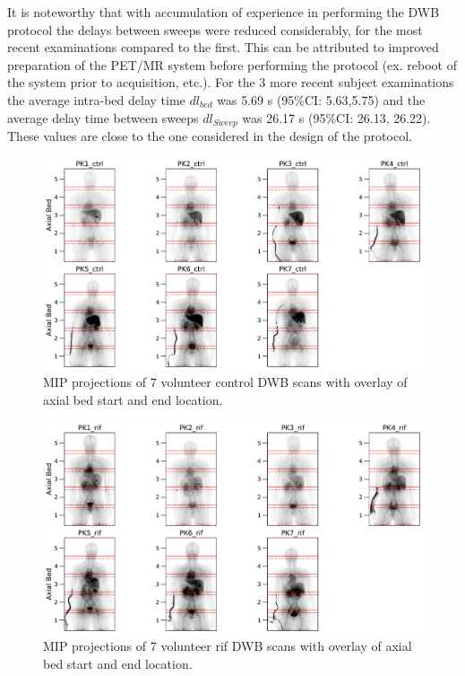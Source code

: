 It is noteworthy that with accumulation of experience in performing the DWB protocol the delays between sweeps were reduced considerably, for the most recent examinations compared to the first. This can be attributed to improved preparation of the PET/MR system before performing the protocol (ex. reboot of the system prior to acquisition, etc.).
For the 3 more recent subject examinations the average intra-bed delay time $dl_{bed}$ was 5.69 s (95\%CI: 5.63,5.75) and the average delay time between sweeps $dl_{Sweep}$ was 26.17 s (95\%CI: 26.13, 26.22).
These values are close to the one considered in the design of the protocol.\\

%
\begin{figure} [ht!]
\centering
\includegraphics[scale=0.5,angle=0]{3_Results/3_1_DWB_Optimization/figures/3_1_MIPS_ctrl.pdf}
\caption{MIP projections of 7 volunteer control DWB scans with overlay of axial bed start and end location.} 
\label{fig3_1:ctrl_mips}
\end{figure}
%
\begin{figure} [ht!]
\centering
\includegraphics[scale=0.5,angle=0]{3_Results/3_1_DWB_Optimization/figures/3_1_MIPS_rif.pdf}
\caption{MIP projections of 7 volunteer rif DWB scans with overlay of axial bed start and end location.} 
\label{fig3_1:rif_mips}
\end{figure}
